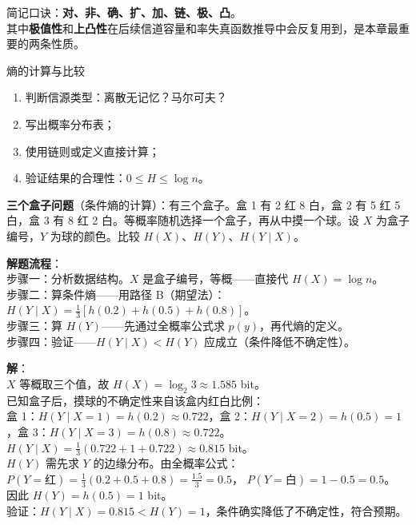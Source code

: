 \noindent 简记口诀：\textbf{对、非、确、扩、加、链、极、凸}。\\
其中\textbf{极值性}和\textbf{上凸性}在后续信道容量和率失真函数推导中会反复用到，是本章最重要的两条性质。

\begin{methodBox}{熵的计算与比较}
\begin{enumerate}
  \item 判断信源类型：离散无记忆？马尔可夫？
  \item 写出概率分布表；
  \item 使用链则或定义直接计算；
  \item 验证结果的合理性：$0 \le H \le \log n$。
\end{enumerate}
\end{methodBox}

\begin{example}
\label{ex:ch2-three-boxes-conditional-entropy}
\textbf{三个盒子问题}（条件熵的计算）：有三个盒子。盒 1 有 2 红 8 白，盒 2 有 5 红 5 白，盒 3 有 8 红 2 白。等概率随机选择一个盒子，再从中摸一个球。设 $X$ 为盒子编号，$Y$ 为球的颜色。比较 $H(X)$、$H(Y)$、$H(Y \mid X)$。

\noindent \textbf{解题流程}：\\[2pt]
步骤一：分析数据结构。$X$ 是盒子编号，等概——直接代 $H(X)=\log n$。\\
步骤二：算条件熵——用路径 B（期望法）：$H(Y\mid X)=\frac{1}{3}[h(0.2)+h(0.5)+h(0.8)]$。\\
步骤三：算 $H(Y)$——先通过全概率公式求 $p(y)$，再代熵的定义。\\
步骤四：验证——$H(Y\mid X) < H(Y)$ 应成立（条件降低不确定性）。

\textbf{解}：\\
$X$ 等概取三个值，故 $H(X)=\log_2 3 \approx 1.585$ bit。\\
已知盒子后，摸球的不确定性来自该盒内红白比例：\\
盒 1：$H(Y\mid X=1)=h(0.2)\approx 0.722$，盒 2：$H(Y\mid X=2)=h(0.5)=1$，盒 3：$H(Y\mid X=3)=h(0.8)\approx 0.722$。\\
$H(Y\mid X)=\frac{1}{3}(0.722+1+0.722)\approx 0.815$ bit。\\
$H(Y)$ 需先求 $Y$ 的边缘分布。由全概率公式：\\[2pt]
$P(Y=\text{红}) = \frac{1}{3}(0.2+0.5+0.8)=\frac{1.5}{3}=0.5$，
$P(Y=\text{白}) = 1-0.5=0.5$。\\[2pt]
因此 $H(Y)=h(0.5)=1$ bit。\\[2pt]
验证：$H(Y\mid X)=0.815 < H(Y)=1$，条件确实降低了不确定性，符合预期。
\end{example}

